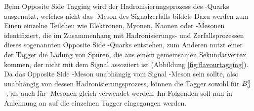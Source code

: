 Beim Opposite Side Tagging wird der Hadronisierungsprozess des \bquark-Quarks ausgenutzt, welches nicht das \B-Meson des Signalzerfalls bildet. Dazu werden zum Einen einzelne Teilchen wie Elektronen, Myonen, Kaonen oder \D-Mesonen identifiziert, die im Zusammenhang mit Hadronisierungs- und Zerfallsprozessen dieses sogenannten Opposite Side \bquark-Quarks entstehen, zum Anderen nutzt einer der Tagger die Ladung von Spuren, die aus einem gemeinsamen Sekundärvertex kommen, der nicht mit dem Signal \B assoziiert ist (Abbildung \ref{fig:flavourtagging}). Da das Opposite Side \B-Meson unabhängig vom Signal \B-Meson sein sollte, also unabhängig von dessen Hadronisierungsprozess, können die Tagger sowohl für {{\ensuremath{\B^0_\dquark}}\xspace}-, als auch für  \Bs-Mesonen gleich verwendet werden. Im Folgenden soll nun in Anlehnung an \cite{tagging} auf die einzelnen Tagger eingegangen werden.
